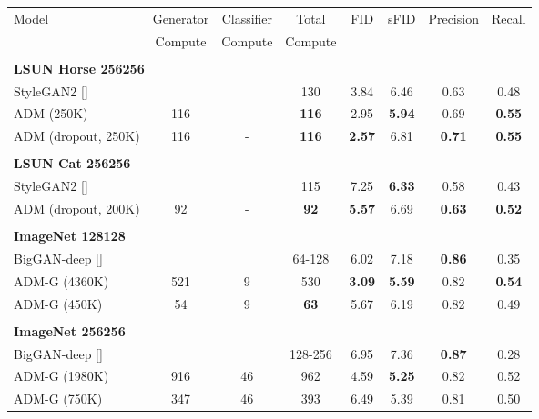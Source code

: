 \documentclass{article}
\newcommand{\shortcite}[1]{[\citenum{#1}]}
\begin{document}
\begin{table}[h]
    \setlength\tabcolsep{3.5pt}
    \begin{center}
    \begin{small}
    \begin{tabular}{lccccccc}
    \toprule
    Model & Generator & Classifier & Total   & FID & sFID & Precision & Recall \\
          & Compute    & Compute  & Compute &     &      &           &        \\
    \toprule
    \\
    \multicolumn{6}{l}{\bf{LSUN Horse} 256256} \\
    \toprule
    StyleGAN2 \shortcite{stylegan2}  & & & 130 & 3.84          & 6.46      &  0.63      & 0.48 \\
    ADM (250K)       & 116 & - & \bf{116} & 2.95          & \bf{5.94} &  0.69      & \bf{0.55} \\
    ADM (dropout, 250K)                     & 116 & - & \bf{116} & \bf{2.57}    & 6.81 &  \bf{0.71}  & \bf{0.55} \\
    \\
    \multicolumn{6}{l}{\bf{LSUN Cat} 256256} \\
    \toprule
    StyleGAN2 \shortcite{stylegan2}  & & & 115 & 7.25          & \bf{6.33} &  0.58      & 0.43 \\
    ADM (dropout, 200K)                     & 92  & - & \bf{92} & \bf{5.57}    & 6.69      &  \bf{0.63}  & \bf{0.52} \\
    \\
    \multicolumn{6}{l}{\bf{ImageNet} 128128} \\
    \toprule
    BigGAN-deep \shortcite{biggan}  & & & 64-128 & 6.02      & 7.18      & \bf{0.86} & 0.35 \\
    ADM-G (4360K)                   & 521 & 9 & 530       & \bf 3.09 & \bf 5.59 & 0.82 & \bf 0.54 \\
    ADM-G (450K)                    & 54 & 9 & \bf{63} & 5.67 & 6.19 & 0.82 & 0.49 \\    
    \\
    \multicolumn{6}{l}{\bf{ImageNet} 256256} \\
    \toprule
    BigGAN-deep \shortcite{biggan}  &     &    & 128-256  & 6.95      & 7.36      & \bf{0.87}& 0.28 \\
    ADM-G (1980K)                   & 916 & 46 & 962      & 4.59      & \bf{5.25} & 0.82     & 0.52 \\
    ADM-G (750K)                    & 347 & 46 & 393      & 6.49      & 5.39      & 0.81     & 0.50 \\

\end{tabular}
\end{small}
\end{center}
\end{table}
\end{document}
